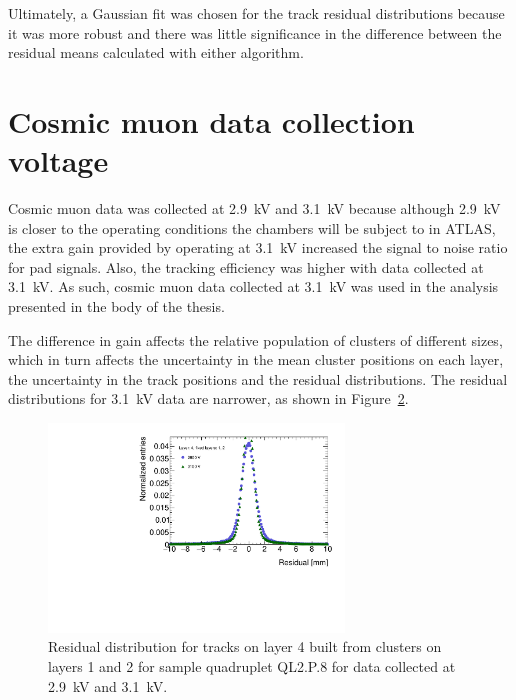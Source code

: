 \begin{figure}
  \caption{}
  \label{fig:double_Gaussian_compare_fits}

\end{figure}
\newpage
\restoregeometry

Ultimately, a Gaussian fit was chosen for the track residual distributions because it was more robust and there was little significance in the difference between the residual means calculated with either algorithm.

\section{Cosmic muon data collection voltage}
\label{appendix:systematics_2900V_vs_3100V}


Cosmic muon data was collected at \SI{2.9}{kV} and \SI{3.1}{kV} because although \SI{2.9}{kV} is closer to the operating conditions the chambers will be subject to in ATLAS, the extra gain provided by operating at \SI{3.1}{kV} increased the signal to noise ratio for pad signals. Also, the tracking efficiency was higher with data collected at \SI{3.1}{kV}. As such, cosmic muon data collected at \SI{3.1}{kV} was used in the analysis presented in the body of the thesis.

The difference in gain affects the relative population of clusters of different sizes, which in turn affects the uncertainty in the mean cluster positions on each layer, the uncertainty in the track positions and the residual distributions. The residual distributions for \SI{3.1}{kV} data are narrower, as shown in Figure~\ref{fig:res_dist_2900V_3100V_412}.

\begin{figure}
    \centering
    \includegraphics[width = 0.7\textwidth]{figures/figure_residual_distributions_blue_QL2P08_2900V_2021-05-21_green_QL2P08_3100V_2021-05-21_layer4_fixedlayers12.pdf}
    \caption{Residual distribution for tracks on layer 4 built from clusters on layers 1 and 2 for sample quadruplet QL2.P.8 for data collected at \SI{2.9}{kV} and \SI{3.1}{kV}.}
    \label{fig:res_dist_2900V_3100V_412}
\end{figure}

